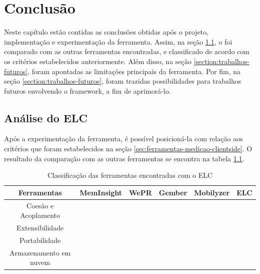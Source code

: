 \documentclass[12pt]{tcc}
\newcommand{\cmark}{\ding{51}}
\newcommand{\xmark}{\ding{55}}
\begin{document}
\chapter{Conclusão}
	\label{cap:conclusão}

	Neste capítulo estão contidas as conclusões obtidas após o projeto, implementação e experimentação da ferramenta. Assim, na seção \ref{section:analise-do-elc}, o  foi comparado com as outras ferramentas encontradas, e classificado de acordo com os critérios estabelecidos anteriormente. Além disso, na seção \ref{section:trabalhos-futuros}, foram apontadas as limitações principais da ferramenta. Por fim, na seção \ref{section:trabalhos-futuros}, foram trazidas possibilidades para trabalhos futuros envolvendo o framework, a fim de aprimorá-lo.

	\section{Análise do ELC}
	\label{section:analise-do-elc}

	Após a experimentação da ferramenta, é possível posicioná-la com relação aos critérios que foram estabelecidos na seção \ref{sec:ferramentas-medicao-clientside}. O resultado da comparação com as outras ferramentas se encontra na tabela \ref{table:classificacao-com-elc}.

	\begin{table}[ht]
	\caption{Classificação das ferramentas encontradas com o ELC} %
	\centering %
	\begin{tabular}{c c c c c c} %
	\toprule %

	\textbf{Ferramentas} &\textbf{MemInsight} & \textbf{WePR} & \textbf{Gember} & \textbf{Mobilyzer} & \textbf{ELC}  \\ [0.4ex]

	\midrule %
	Coesão e Acoplamento & \cmark & \cmark & \cmark & \cmark  & \cmark  \\ 
	Extensibilidade & \xmark & \xmark & \xmark & \xmark  & \cmark \\
	Portabilidade & \cmark & \xmark & \xmark & \xmark  & \cmark \\
	Armazenamento em nuvem & \xmark & \cmark & \cmark & \cmark & \cmark  \\
	\bottomrule %
	\end{tabular}
	\label{table:classificacao-com-elc} %
	\end{table}
\end{document}

